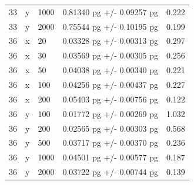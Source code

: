 \documentclass[12pt]{article}
\begin{document}
\begin{longtable}{lllll}
33        & y        & 1000 & 0.81340 pg +/- 0.09257 pg    & 0.222                  \\
33        & y        & 2000 & 0.75544 pg +/- 0.10195 pg    & 0.199                  \\
36        & x        & 20   & 0.03328 pg +/- 0.00313 pg    & 0.297                  \\
36        & x        & 30   & 0.03569 pg +/- 0.00305 pg    & 0.256                  \\
36        & x        & 50   & 0.04038 pg +/- 0.00340 pg    & 0.221                  \\
36        & x        & 100  & 0.04256 pg +/- 0.00437 pg    & 0.227                  \\
36        & x        & 200  & 0.05403 pg +/- 0.00756 pg    & 0.122                  \\
36        & y        & 100  & 0.01772 pg +/- 0.00269 pg    & 1.032                  \\
36        & y        & 200  & 0.02565 pg +/- 0.00303 pg    & 0.568                  \\
36        & y        & 500  & 0.03717 pg +/- 0.00370 pg    & 0.236                  \\
36        & y        & 1000 & 0.04501 pg +/- 0.00577 pg    & 0.187                  \\
36        & y        & 2000 & 0.03722 pg +/- 0.00744 pg    & 0.139                  \\
\end{longtable}






\vskip 0.2in

\end{document}
